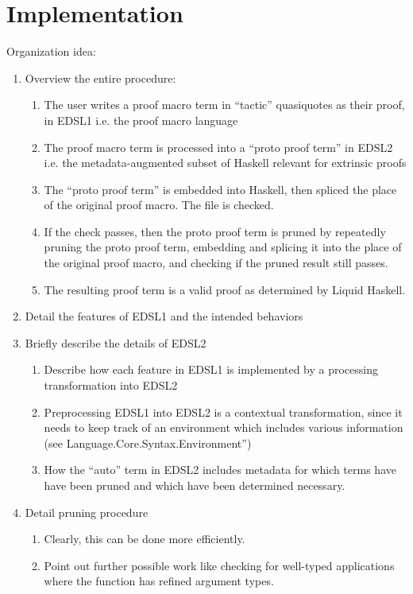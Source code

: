 \section{Implementation}

Organization idea:
\begin{enumerate}
  \item Overview the entire procedure:
  \begin{enumerate}
    \item The user writes a proof macro term in ``tactic'' quasiquotes as their proof, in EDSL1 i.e. the proof macro language
    \item The proof macro term is processed into a ``proto proof term'' in EDSL2 i.e. the metadata-augmented subset of Haskell relevant for extrinsic proofs
    \item The ``proto proof term'' is embedded into Haskell, then spliced the place of the original proof macro. The file is checked.
    \item If the check passes, then the proto proof term is pruned by repeatedly pruning the proto proof term, embedding and splicing it into the place of the original proof macro, and checking if the pruned result still passes.
    \item The resulting proof term is a valid proof as determined by Liquid Haskell.
  \end{enumerate}
  \item Detail the features of EDSL1 and the intended behaviors
  \item Briefly describe the details of EDSL2
  \begin{enumerate}
    \item Describe how each feature in EDSL1 is implemented by a processing transformation into EDSL2
    \item Preprocessing EDSL1 into EDSL2 is a contextual transformation, since it needs to keep track of an environment which includes various information (see Language.Core.Syntax.Environment'')
    \item How the ``auto'' term in EDSL2 includes metadata for which terms have have been pruned and which have been determined necessary.
  \end{enumerate}
  \item Detail pruning procedure
  \begin{enumerate}
    \item Clearly, this can be done more efficiently.
    \item Point out further possible work like checking for well-typed applications where the function has refined argument types.
  \end{enumerate}
\end{enumerate}

